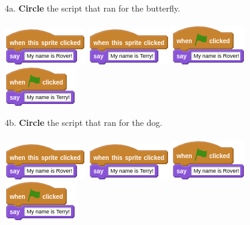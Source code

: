 \documentclass[letterpaper,12pt]{article}
\begin{document}
\noindent 4a. \textbf{Circle} the script that ran for the butterfly. \\ \\
\includegraphics[scale=.7,valign=t]{q4_script0.png} \hspace{1cm}
\includegraphics[scale=.7,valign=t]{q4_script1.png} \hspace{1cm}
\includegraphics[scale=.7,valign=t]{q4_script2.png} \hspace{1cm}
\includegraphics[scale=.7,valign=t]{q4_script3.png} \hspace{1cm}
\vspace{1cm}


\noindent 4b. \textbf{Circle} the script that ran for the dog. \\ \\
\includegraphics[scale=.7,valign=t]{q4_script0.png} \hspace{1cm}
\includegraphics[scale=.7,valign=t]{q4_script1.png} \hspace{1cm}
\includegraphics[scale=.7,valign=t]{q4_script2.png} \hspace{1cm}
\includegraphics[scale=.7,valign=t]{q4_script3.png} \hspace{1cm}
\vspace{1cm}
\end{document}
